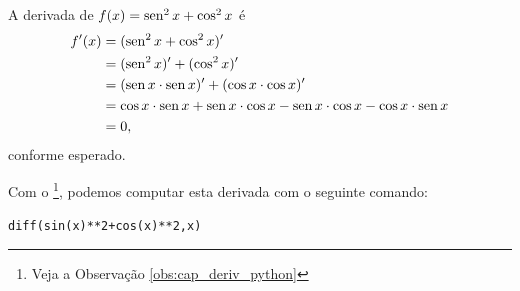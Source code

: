 \begin{ex}
  A derivada de $f(x) = \operatorname{sen}^2 x + \cos^2 x$ é
  \begin{align}
    f'(x) &= (\operatorname{sen}^2x + \cos^2 x)' \\
          &= (\operatorname{sen}^2 x)' + (\cos^2 x)' \\
          &= (\operatorname{sen} x\cdot \operatorname{sen} x)' + (\cos x\cdot \cos x)' \\
          &= \cos x\cdot \operatorname{sen} x + \operatorname{sen} x\cdot\cos x -\operatorname{sen} x\cdot \cos x - \cos x\cdot\operatorname{sen} x\\
          &= 0,
  \end{align}
  conforme esperado.

  \ifispython
  Com o \sympy\footnote{Veja a Observação \ref{obs:cap_deriv_python}}, podemos computar esta derivada com o seguinte comando:
\begin{verbatim}
diff(sin(x)**2+cos(x)**2,x)
\end{verbatim}
  \fi
\end{ex}

